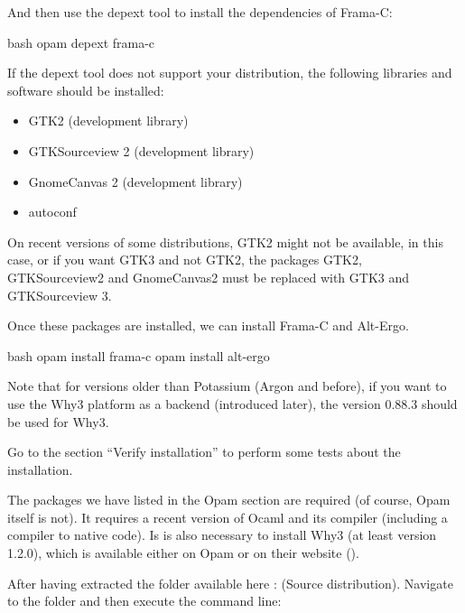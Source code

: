 And then use the depext tool to install the dependencies of Frama-C:


\begin{CodeBlock}{bash}
opam depext frama-c
\end{CodeBlock}


If the depext tool does not support your distribution, the following
libraries and software should be installed:

\begin{itemize}
\item GTK2 (development library)
\item GTKSourceview 2 (development library)
\item GnomeCanvas 2 (development library)
\item autoconf
\end{itemize}

On recent versions of some distributions, GTK2 might not be available, in
this case, or if you want GTK3 and not GTK2, the packages GTK2, GTKSourceview2
and GnomeCanvas2 must be replaced with GTK3 and GTKSourceview 3.


Once these packages are installed, we can install Frama-C and Alt-Ergo.


\begin{CodeBlock}{bash}
opam install frama-c
opam install alt-ergo
\end{CodeBlock}


Note that for versions older than Potassium (Argon and before), if you
want to use the Why3 platform as a backend (introduced later), the version
0.88.3 should be used for Why3.


Go to the section ``Verify installation'' to perform some tests about
the installation.





The packages we have listed in the Opam section are required (of course,
Opam itself is not). It requires a recent version of Ocaml and its
compiler (including a compiler to native code). Is is also necessary to
install Why3 (at least version 1.2.0), which is available either on Opam
or on their website ().



After having extracted the folder available here :
 (Source distribution).
Navigate to the folder and then execute the command line:



